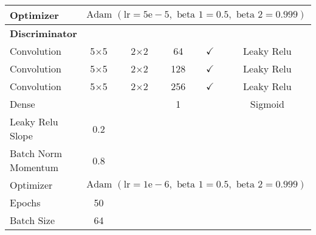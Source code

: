 \begin{longtable}[c]{@{}lccccc@{}}
	Optimizer & \multicolumn{5}{l}{$\text { Adam }(\mathrm{lr}=5 \mathrm{e}-5, \text { beta } 1=0.5, \text { beta } 2=0.999)$} \\ \hline
	\multicolumn{6}{l}{\textbf{Discriminator}} \\
	Convolution & \multicolumn{1}{c}{5$\times$5} & 2$\times$2 & 64 & $\checkmark$ & Leaky Relu \\
	Convolution & \multicolumn{1}{c}{5$\times$5} & 2$\times$2 & 128 & $\checkmark$ & Leaky Relu \\
	Convolution & \multicolumn{1}{c}{5$\times$5} & 2$\times$2 & 256 & $\checkmark$ & Leaky Relu \\
	Dense & \multicolumn{1}{c}{} &  & 1 &  & Sigmoid \\ \hline
	Leaky Relu Slope & 0.2 & \multicolumn{1}{l}{} & \multicolumn{1}{l}{} & \multicolumn{1}{l}{} & \multicolumn{1}{l}{} \\
	Batch Norm Momentum & 0.8 & \multicolumn{1}{l}{} & \multicolumn{1}{l}{} & \multicolumn{1}{l}{} & \multicolumn{1}{l}{} \\
	Optimizer & \multicolumn{5}{l}{$\text { Adam }(\mathrm{lr}=1 \mathrm{e}-6, \text { beta } 1=0.5, \text { beta } 2=0.999)$} \\ \hline
	Epochs & 50 & \multicolumn{1}{l}{} & \multicolumn{1}{l}{} & \multicolumn{1}{l}{} & \multicolumn{1}{l}{} \\
	Batch Size & 64 & \multicolumn{1}{l}{} & \multicolumn{1}{l}{} & \multicolumn{1}{l}{} & \multicolumn{1}{l}{} \\ \hline
\end{longtable}

